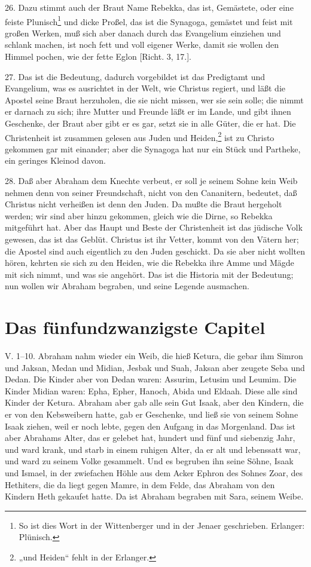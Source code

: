26. Dazu stimmt auch der Braut Name Rebekka, das ist, Gemästete, oder eine feiste Plunisch\footnote{So ist dies Wort in der Wittenberger und in der Jenaer geschrieben. Erlanger: Plünisch.} und dicke Proßel, das ist die Synagoga, gemästet und feist mit großen Werken, muß sich aber danach durch das Evangelium einziehen und schlank machen, ist noch fett und voll eigener Werke, damit sie wollen den Himmel pochen, wie der fette Eglon [Richt. 3, 17.].

27. Das ist die Bedeutung, dadurch vorgebildet ist das Predigtamt und Evangelium, was es ausrichtet in der Welt, wie Christus regiert, und läßt die Apostel seine Braut herzuholen, die sie nicht missen, wer sie sein solle; die nimmt er darnach zu sich; ihre Mutter und Freunde läßt er im Lande, und gibt ihnen Geschenke, der Braut aber gibt er es gar, setzt sie in alle Güter, die er hat. Die Christenheit ist zusammen gelesen aus Juden und Heiden,\footnote{„und Heiden“ fehlt in der Erlanger.} ist zu Christo gekommen gar mit einander; aber die Synagoga hat nur ein Stück und Partheke, ein geringes Kleinod davon.

28. Daß aber Abraham dem Knechte verbeut, er soll je seinem Sohne kein Weib nehmen denn von seiner Freundschaft, nicht von den Cananitern, bedeutet, daß Christus nicht verheißen ist denn den Juden. Da mußte die Braut hergeholt werden; wir sind aber hinzu gekommen, gleich wie die Dirne, so Rebekka mitgeführt hat. Aber das Haupt und Beste der Christenheit ist das jüdische Volk gewesen, das ist das Geblüt. Christus ist ihr Vetter, kommt von den Vätern her; die Apostel sind auch eigentlich zu den Juden geschickt. Da sie aber nicht wollten hören, kehrten sie sich zu den Heiden, wie die Rebekka ihre Amme und Mägde mit sich nimmt, und was sie angehört. Das ist die Historia mit der Bedeutung; nun wollen wir Abraham begraben, und seine Legende ausmachen.

\section{Das fünfundzwanzigste Capitel}

\begin{schriftzitat}
V. 1–10. Abraham nahm wieder ein Weib, die hieß Ketura, die gebar ihm Simron und Jaksan, Medan und Midian, Jesbak und Suah, Jaksan aber zeugete Seba und Dedan. Die Kinder aber von Dedan waren: Assurim, Letusim und Leumim. Die Kinder Midian waren: Epha, Epher, Hanoch, Abida und Eldaah. Diese alle sind Kinder der Ketura. Abraham aber gab alle sein Gut Isaak, aber den Kindern, die er von den Kebsweibern hatte, gab er Geschenke, und ließ sie von seinem Sohne Isaak ziehen, weil er noch lebte, gegen den Aufgang in das Morgenland.
Das ist aber Abrahams Alter, das er gelebet hat, hundert und fünf und siebenzig Jahr, und ward krank, und starb in einem ruhigen Alter, da er alt und lebenssatt war, und ward zu seinem Volke gesammelt. Und es begruben ihn seine Söhne, Isaak und Ismael, in der zwiefachen Höhle aus dem Acker Ephron des Sohnes Zoar, des Hethiters, die da liegt gegen Mamre, in dem Felde, das Abraham von den Kindern Heth gekaufet hatte. Da ist Abraham begraben mit Sara, seinem Weibe.
\end{schriftzitat}

